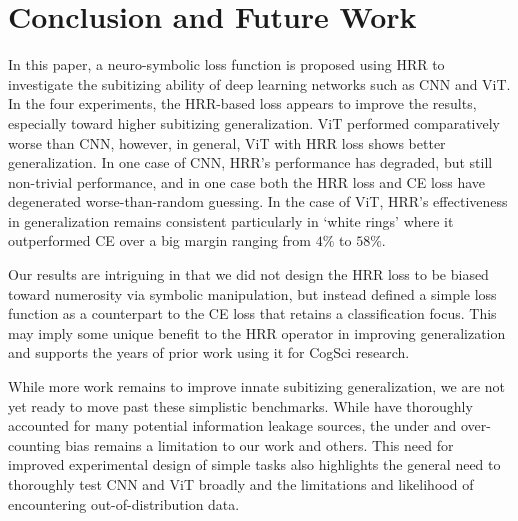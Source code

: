 \documentclass[letterpaper]{article} %
\begin{document}
\section{Conclusion and Future Work} \label{sec:conclusion}
In this paper, a neuro-symbolic loss function is proposed using HRR to investigate the subitizing ability of deep learning networks such as CNN and ViT. In the four experiments, the HRR-based loss appears to improve the results, especially toward higher subitizing generalization. ViT performed comparatively worse than CNN, however, in general, ViT with HRR loss shows better generalization. In one case of CNN, HRR’s performance has degraded, but still non-trivial performance, and in one case both the HRR loss and CE loss have degenerated worse-than-random guessing. In the case of ViT, HRR’s effectiveness in generalization remains consistent particularly in `white rings’ where it outperformed CE over a big margin ranging from $4\%$ to $58\%$. 
\par 
Our results are intriguing in that we did not design the HRR loss to be biased toward numerosity via symbolic manipulation, but instead defined a simple loss function as a counterpart to the CE loss that retains a classification focus. This may imply some unique benefit to the HRR operator in improving generalization and supports the years of prior work using it for CogSci research. 
\par
While more work remains to improve innate subitizing generalization, we are not yet ready to move past these simplistic benchmarks. While \cite{b1} have thoroughly accounted for many potential information leakage sources, the under and over-counting bias remains a limitation to our work and others. This need for improved experimental design of simple tasks also highlights the general need to thoroughly test CNN and ViT broadly and the limitations and likelihood of encountering out-of-distribution data.
\end{document}
